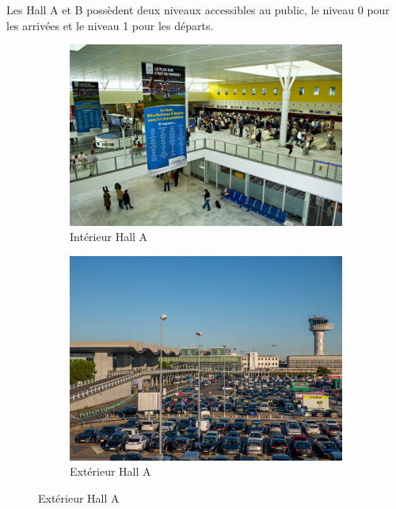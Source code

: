 Les Hall A et B possèdent deux niveaux accessibles au public, le niveau 0 pour les arrivées et le niveau 1 pour les départs.

\begin{figure}[hbt!]
    \begin{subfigure}{0.5\textwidth}
      \centering
      \includegraphics[width=.7\linewidth]{Images/inthalla.jpg}  
      \caption{Intérieur Hall A}
      \label{fig:inthalla}
    \end{subfigure}
    \begin{subfigure}{0.5\textwidth}
      \centering
      \includegraphics[width=.7\linewidth]{Images/exthalla.jpg}  
      \caption{Extérieur Hall A}
      \label{fig:exthalla}
    \end{subfigure}
        

\end{figure}
